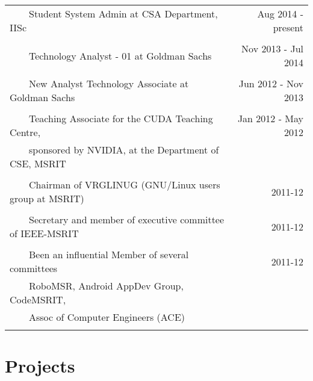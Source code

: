 \documentclass[a4paper,10pt]{article} %
\newcommand{\tabitem}{~~\llap{\textbullet}~~}
\begin{document}
\begin{tabular}{lr}
\tabitem Student System Admin at CSA Department, IISc & Aug 2014 - present \\
&\\
\tabitem Technology Analyst - 01 at Goldman Sachs & Nov 2013 - Jul 2014\\
&\\
\tabitem New Analyst Technology Associate at Goldman Sachs & Jun 2012 - Nov 2013\\
&\\
\tabitem Teaching Associate for the CUDA Teaching Centre,  & Jan 2012 - May 2012\\
~~~~sponsored by NVIDIA, at the Department of CSE, MSRIT &  \\
&\\
\tabitem Chairman of VRGLINUG (GNU/Linux users group at MSRIT) & 2011-12 \\
&\\
\tabitem Secretary and member of executive committee of IEEE-MSRIT & 2011-12 \\
&\\
\tabitem Been an influential Member of several committees & 2011-12 \\
~~~~RoboMSR, Android AppDev Group, CodeMSRIT, & \\
~~~~Assoc of Computer Engineers (ACE) & \\
&\\
\end{tabular}


\section{Projects}
\end{document}
